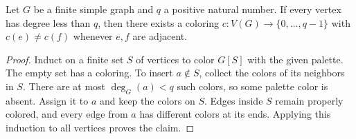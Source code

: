 \begin{lemma}
Let $G$ be a finite simple graph and $q$ a positive natural number.
If every vertex has degree less than $q$, then there exists a coloring
$c:V(G)\to\{0,\ldots,q-1\}$ with $c(e)\ne c(f)$ whenever $e,f$ are adjacent.
\end{lemma}
\begin{proof}
Induct on a finite set $S$ of vertices to color $G[S]$ with the given palette.
The empty set has a coloring. To insert $a\notin S$, collect the colors
of its neighbors in $S$. There are at most $\deg_G(a)<q$ such colors,
so some palette color is absent. Assign it to $a$ and keep the colors on
$S$. Edges inside $S$ remain properly colored, and every edge from $a$
has different colors at its ends. Applying this induction to all vertices
proves the claim.
\end{proof}
